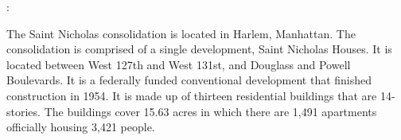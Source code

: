 :  

 

The Saint Nicholas consolidation is located in Harlem, Manhattan. The consolidation is comprised of a single development, Saint Nicholas Houses. It is located between West 127th and West 131st, and Douglass and Powell Boulevards. It is a federally funded conventional development that finished construction in 1954. It is made up of thirteen residential buildings that are 14-stories. The buildings cover 15.63 acres in which there are 1,491 apartments officially housing 3,421 people.  